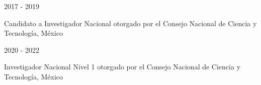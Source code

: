 

\begin{minipage}{1.5 in}
	2017 - 2019\\
\end{minipage}
\begin{minipage}{4.5in}
	Candidato a Investigador Nacional otorgado por el Consejo Nacional de Ciencia y Tecnología, México\\ 
\end{minipage}

\begin{minipage}{1.5 in}
	2020 - 2022\\
\end{minipage}
\begin{minipage}{4.5in}
	Investigador Nacional Nivel 1 otorgado por el Consejo Nacional de Ciencia y Tecnología, México\\ 
\end{minipage}